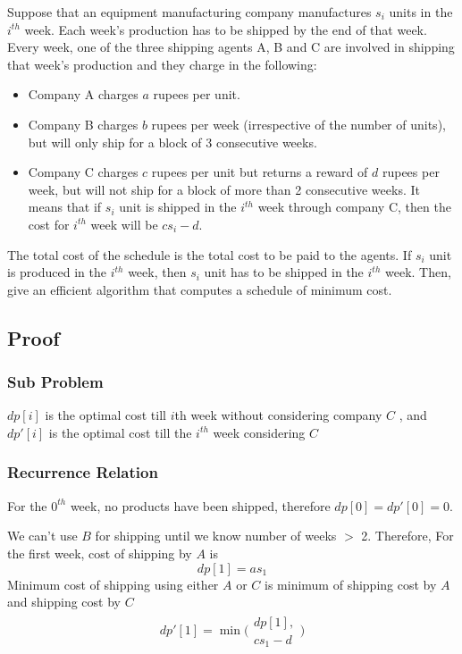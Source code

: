 \documentclass[12pt]{article}
\newenvironment{statement}{\color[rgb]{1.00,0.00,0.50} {}}{}
\begin{document}
\begin{statement}
    Suppose that an equipment manufacturing company manufactures $s_i$ units in the
    $i^{th}$ week. Each week’s production has to be shipped by the end of that week. Every week, one of the
    three shipping agents A, B and C are involved in shipping that week’s production and they charge
    in the following:
    \begin{itemize}
        \item Company A charges $a$ rupees per unit.
        \item  Company B charges $b$ rupees per week (irrespective of the number of units), but will only ship for a block of 3 consecutive weeks.
        \item Company C charges $c$ rupees per unit but returns a reward of $d$ rupees per week, but will
              not ship for a block of more than 2 consecutive weeks. It means that if $s_i$ unit is shipped in
              the $i^{th}$ week through company C, then the cost for $i^{th}$ week will be $c s_i - d$.
    \end{itemize}
    The total cost of the schedule is the total cost to be paid to the agents. If $s_i$ unit is produced in the
    $i^{th}$ week, then $s_i$ unit has to be shipped in the $i^{th}$ week. Then, give an efficient algorithm that
    computes a schedule of minimum cost.
\end{statement}


\subsection{Proof}

\subsubsection{Sub Problem}

$dp[i]$ is the optimal cost till $i$th week without considering company $C$ , and $dp'[i]$ is the optimal cost till the $i^{th}$ week considering $C$


\subsubsection{Recurrence Relation}

For the $0^{th}$ week, no products have been shipped, therefore
$dp[0] = dp'[0] = 0$.

We can't use $B$ for shipping until we know number of weeks $>$ 2. Therefore,
For the first week,
cost of shipping by $A$ is
$$dp[1] = a s_1$$
Minimum cost of shipping using either $A$ or $C$ is minimum of shipping cost by $A$ and shipping cost by $C$
\begin{align*}
    dp'[1] = \min \Biggl(
    \begin{array}{cc}
    dp[1],                \\
    c s_1 - d
    \end{array}
    \Biggr)
\end{align*}
\end{document}

